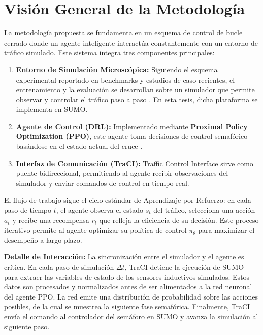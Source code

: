 \section{Visión General de la Metodología}
La metodología propuesta se fundamenta en un esquema de control de bucle cerrado donde un agente inteligente interactúa constantemente con un entorno de tráfico simulado. Este sistema integra tres componentes principales:

\begin{enumerate}
    \item \textbf{Entorno de Simulación Microscópica:} Siguiendo el esquema experimental reportado en benchmarks y estudios de caso recientes, el entrenamiento y la evaluación se desarrollan sobre un simulador que permite observar y controlar el tráfico paso a paso \cite{benchmark_ault2021,case_gokulan2020}. En esta tesis, dicha plataforma se implementa en SUMO.
    \item \textbf{Agente de Control (DRL):} Implementado mediante \textbf{Proximal Policy Optimization (PPO)}, este agente toma decisiones de control semafórico basándose en el estado actual del cruce \cite{ppo_karedla2025,haps_ppo2025}.
    \item \textbf{Interfaz de Comunicación (TraCI):} Traffic Control Interface sirve como puente bidireccional, permitiendo al agente recibir observaciones del simulador y enviar comandos de control en tiempo real.
\end{enumerate}

El flujo de trabajo sigue el ciclo estándar de Aprendizaje por Refuerzo: en cada paso de tiempo $t$, el agente observa el estado $s_t$ del tráfico, selecciona una acción $a_t$ y recibe una recompensa $r_t$ que refleja la eficiencia de su decisión. Este proceso iterativo permite al agente optimizar su política de control $\pi_\theta$ para maximizar el desempeño a largo plazo.

\textbf{Detalle de Interacción:}
La sincronización entre el simulador y el agente es crítica. En cada paso de simulación $\Delta t$, TraCI detiene la ejecución de SUMO para extraer las variables de estado de los sensores inductivos simulados. Estos datos son procesados y normalizados antes de ser alimentados a la red neuronal del agente PPO. La red emite una distribución de probabilidad sobre las acciones posibles, de la cual se muestrea la siguiente fase semafórica. Finalmente, TraCI envía el comando al controlador del semáforo en SUMO y avanza la simulación al siguiente paso.

